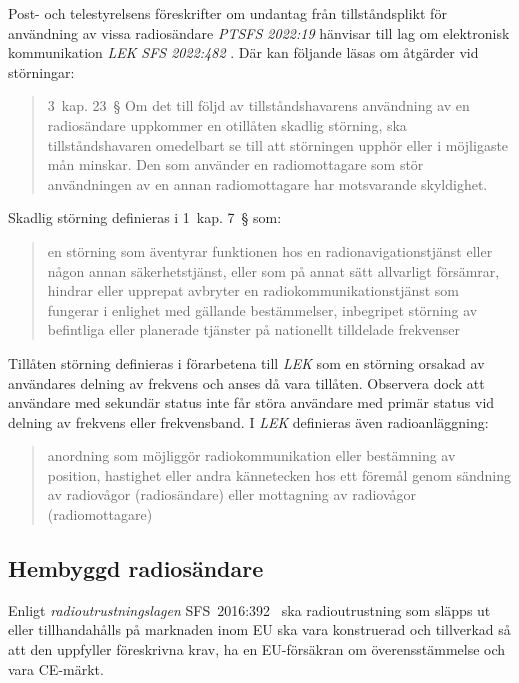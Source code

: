 Post- och telestyrelsens föreskrifter om undantag från tillståndsplikt för
användning av vissa radiosändare \emph{PTSFS 2022:19} \cite{PTSFS2022:19}
hänvisar till lag om elektronisk kommunikation \emph{LEK} \emph{SFS 2022:482}
\cite{SFS2022:482}.
Där kan följande läsas om åtgärder vid störningar:
\begin{quote}
	3~kap. 23~\S{} Om det till följd av tillståndshavarens användning av en
	radiosändare uppkommer en otillåten skadlig störning, ska tillståndshavaren
	omedelbart se till att störningen upphör eller i möjligaste mån minskar.
	Den som använder en radiomottagare som stör användningen av en annan
	radiomottagare har motsvarande skyldighet.
\end{quote}
Skadlig störning definieras i 1~kap. 7~\S{} som:
\begin{quote}
	en störning som äventyrar funktionen hos en radionavigationstjänst eller
	någon annan säkerhetstjänst, eller som på annat sätt allvarligt försämrar,
	hindrar eller upprepat avbryter en radiokommunikationstjänst som fungerar i
	enlighet med gällande bestämmelser, inbegripet störning av befintliga eller
	planerade tjänster på nationellt tilldelade frekvenser
\end{quote}
Tillåten störning definieras i förarbetena till \emph{LEK} som en störning
orsakad av användares delning av frekvens och anses då vara tillåten.
Observera dock att användare med sekundär status inte får störa användare med
primär status vid delning av frekvens eller frekvensband.
I \emph{LEK} definieras även radioanläggning:
\begin{quote}
	anordning som möjliggör radiokommunikation eller bestämning av position,
	hastighet eller andra kännetecken hos ett föremål genom sändning av radiovågor
	(radiosändare) eller mottagning av radiovågor (radiomottagare)
\end{quote}

\newpage
{} 

\subsection{Hembyggd radiosändare}
\label{hembyggd radiosandare}
\label{radioutrustningslagen}

Enligt \emph{radioutrustningslagen} SFS~2016:392~\cite{SFS2016:392} ska
radioutrustning som släpps ut eller tillhandahålls på marknaden inom EU ska vara
konstruerad och tillverkad så att den uppfyller föreskrivna krav, ha en
EU-försäkran om överensstämmelse och vara CE-märkt.

